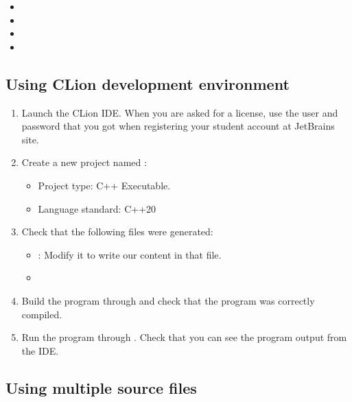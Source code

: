 \begin{itemize}
  \item {}
  \item {}
  \item {}
  \item {}
\end{itemize}

\subsection{Using \textbf{CLion} development environment}

\begin{enumerate}

\item
Launch the CLion IDE.
When you are asked for a license, use the user and password
that you got when registering your student account at JetBrains site.

\item
Create a new project named :

\begin{itemize}
  \item Project type: C++ Executable.
  \item Language standard: C++20
\end{itemize}

\item
Check that the following files were generated:

\begin{itemize}
  \item {}: Modify it to write our  content in that file.
  \item {}
\end{itemize}

\item
Build the program through  and check that the program was correctly compiled.

\item
Run the program through . Check that you can see the program output from the IDE.

\end{enumerate}

\subsection{Using multiple source files}

